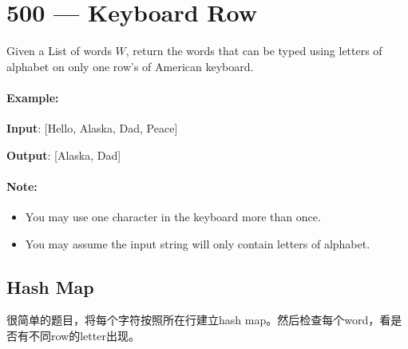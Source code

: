 \section{500 --- Keyboard Row}
Given a List of words $W$, return the words that can be typed using letters of alphabet on only one row's of American keyboard.

 
\paragraph{Example:}

\begin{flushleft}
\textbf{Input}: [Hello, Alaska, Dad, Peace]

\textbf{Output}: [Alaska, Dad]
\end{flushleft}
 

\paragraph{Note:}

\begin{itemize}
\item You may use one character in the keyboard more than once.
\item You may assume the input string will only contain letters of alphabet.
\end{itemize}

\subsection{Hash Map}
很简单的题目，将每个字符按照所在行建立hash map。然后检查每个word，看是否有不同row的letter出现。

